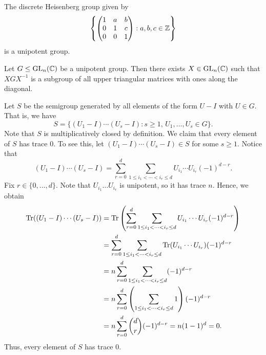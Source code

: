 \begin{exmp}{}
    The discrete Heisenberg group given by 
    \[ \left\{ \begin{pmatrix}
        1 & a & b \\ 
        0 & 1 & c \\ 
        0 & 0 & 1 
    \end{pmatrix} : a, b, c \in \mathbb{Z} \right\} \] 
    is a unipotent group. 
\end{exmp}

\begin{theo}{}
    Let $G \leq \operatorname{GL}_n(\mathbb{C})$ be a unipotent group. Then there exists 
    $X \in \operatorname{GL}_n(\mathbb{C})$ such that $XGX^{-1}$ is a subgroup of all upper triangular 
    matrices with ones along the diagonal. 
\end{theo}
\begin{pf}
    Let $S$ be the semigroup generated by all elements of the form $U - I$ 
    with $U \in G$. That is, we have 
    \[ S = \{(U_1 - I) \cdots (U_s - I) : s \geq 1,\, U_1, \dots, U_s \in G\}. \] 
    Note that $S$ is multiplicatively closed by definition. We claim that every 
    element of $S$ has trace $0$. To see this, let $(U_1 - I) \cdots (U_s - I) 
    \in S$ for some $s \geq 1$. Notice that 
    \[ (U_1 - I) \cdots (U_s - I) = \sum_{r=0}^d \sum_{1 \leq i_1 < \cdots < i_r \leq d}
    U_{i_1} \cdots U_{i_r} (-1)^{d-r}. \] 
    Fix $r \in \{0, \dots, d\}$. Note that $U_{i_1} \dots U_{i_r}$ is
    unipotent, so it has trace $n$. Hence, we obtain 
    \begin{align*}
        \operatorname{Tr}((U_1 - I) \cdots (U_s - I)) 
        &= \operatorname{Tr}\left( \sum_{r=0}^d \sum_{1 \leq i_1 < \cdots < i_r \leq d}
        U_{i_1} \cdots U_{i_r} (-1)^{d-r} \right) \\ 
        &= \sum_{r=0}^d \sum_{1 \leq i_1 < \cdots < i_r \leq d} 
        \operatorname{Tr}(U_{i_1} \cdots U_{i_r}) (-1)^{d-r} \\ 
        &= n \sum_{r=0}^d \sum_{1 \leq i_1 < \cdots < i_r \leq d} (-1)^{d-r} \\ 
        &= n \sum_{r=0}^d \left( \sum_{1 \leq i_1 < \cdots < i_r \leq d} 1 \right) 
        (-1)^{d-r} \\ 
        &= n \sum_{r=0}^d \binom{d}{r} (-1)^{d-r} = n(1-1)^d = 0. 
    \end{align*}
    Thus, every element of $S$ has trace $0$. 


\end{pf}
